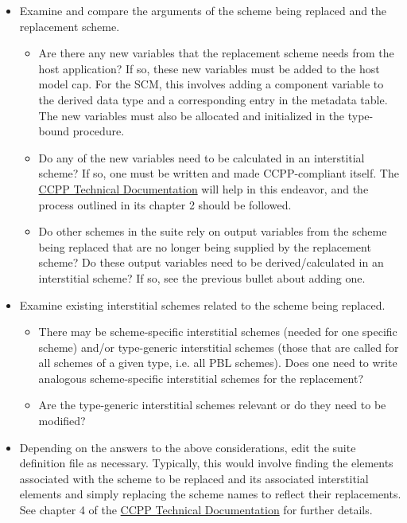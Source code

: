 \begin{itemize}
\item Examine and compare the arguments of the scheme being replaced and the replacement scheme.
\begin{itemize}
\item Are there any new variables that the replacement scheme needs from the host application? If so, these new variables must be added to the host model cap. For the SCM, this involves adding a component variable to the  derived data type and a corresponding entry in the metadata table. The new variables must also be allocated and initialized in the  type-bound procedure.
\item Do any of the new variables need to be calculated in an interstitial scheme? If so, one must be written and made CCPP-compliant itself. The \href{https://dtcenter.org/GMTB/v3.0/ccpp\_tech\_guide}{CCPP Technical Documentation} will help in this endeavor, and the process outlined in its chapter 2 should be followed.
\item Do other schemes in the suite rely on output variables from the scheme being replaced that are no longer being supplied by the replacement scheme? Do these output variables need to be derived/calculated in an interstitial scheme? If so, see the previous bullet about adding one.
\end{itemize}
\item Examine existing interstitial schemes related to the scheme being replaced.
\begin{itemize}
\item There may be scheme-specific interstitial schemes (needed for one specific scheme) and/or type-generic interstitial schemes (those that are called for all schemes of a given type, i.e. all PBL schemes). Does one need to write analogous scheme-specific interstitial schemes for the replacement?
\item Are the type-generic interstitial schemes relevant or do they need to be modified?
\end{itemize}
\item Depending on the answers to the above considerations, edit the suite definition file as necessary. Typically, this would involve finding the  elements associated with the scheme to be replaced and its associated interstitial  elements and simply replacing the scheme names to reflect their replacements. See chapter 4 of the \href{https://dtcenter.org/GMTB/v3.0/ccpp\_tech\_guide}{CCPP Technical Documentation} for further details.
\end{itemize}

